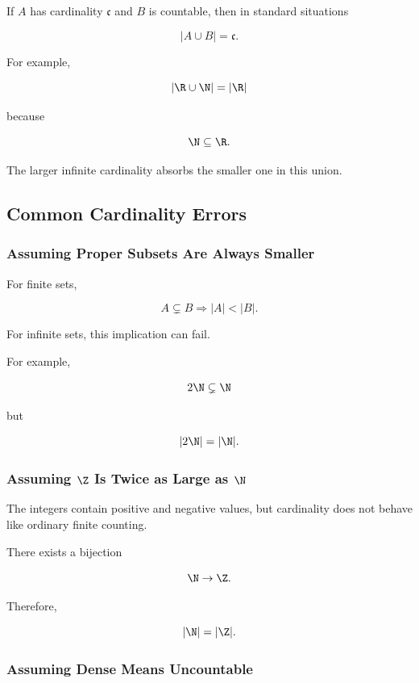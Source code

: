 If \(A\) has cardinality \(\mathfrak c\) and \(B\) is countable, then in
standard situations

\[ |A\cup B|=\mathfrak c. \]

For example,

\[ |\R\cup\N|=|\R| \]

because

\[ \N\subseteq\R. \]

The larger infinite cardinality absorbs the smaller one in this union.

\subsection{Common Cardinality Errors}
\label{subsec:common-cardinality-errors}

\subsubsection{Assuming Proper Subsets Are Always Smaller}

For finite sets,

\[ A\subsetneq B\Longrightarrow|A|<|B|. \]

For infinite sets, this implication can fail.

For example,

\[ 2\N\subsetneq\N \]

but

\[ |2\N|=|\N|. \]

\subsubsection{Assuming \(\Z\) Is Twice as Large as \(\N\)}
\label{subsec:error-z-twice-n}

The integers contain positive and negative values, but cardinality does not
behave like ordinary finite counting.

There exists a bijection

\[ \N\to\Z. \]

Therefore,

\[ |\N|=|\Z|. \]

\subsubsection{Assuming Dense Means Uncountable}
\label{subsec:error-dense-uncountable}


